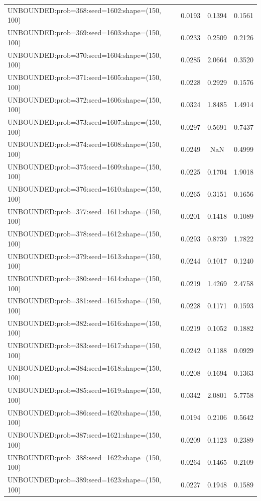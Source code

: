 \begin{longtable}{lccc}
UNBOUNDED:prob=368:seed=1602:shape=(150, 100) &   0.0193 &  0.1394 &  0.1561 \\
UNBOUNDED:prob=369:seed=1603:shape=(150, 100) &   0.0233 &  0.2509 &  0.2126 \\
UNBOUNDED:prob=370:seed=1604:shape=(150, 100) &   0.0285 &  2.0664 &  0.3520 \\
UNBOUNDED:prob=371:seed=1605:shape=(150, 100) &   0.0228 &  0.2929 &  0.1576 \\
UNBOUNDED:prob=372:seed=1606:shape=(150, 100) &   0.0324 &  1.8485 &  1.4914 \\
UNBOUNDED:prob=373:seed=1607:shape=(150, 100) &   0.0297 &  0.5691 &  0.7437 \\
UNBOUNDED:prob=374:seed=1608:shape=(150, 100) &   0.0249 &     NaN &  0.4999 \\
UNBOUNDED:prob=375:seed=1609:shape=(150, 100) &   0.0225 &  0.1704 &  1.9018 \\
UNBOUNDED:prob=376:seed=1610:shape=(150, 100) &   0.0265 &  0.3151 &  0.1656 \\
UNBOUNDED:prob=377:seed=1611:shape=(150, 100) &   0.0201 &  0.1418 &  0.1089 \\
UNBOUNDED:prob=378:seed=1612:shape=(150, 100) &   0.0293 &  0.8739 &  1.7822 \\
UNBOUNDED:prob=379:seed=1613:shape=(150, 100) &   0.0244 &  0.1017 &  0.1240 \\
UNBOUNDED:prob=380:seed=1614:shape=(150, 100) &   0.0219 &  1.4269 &  2.4758 \\
UNBOUNDED:prob=381:seed=1615:shape=(150, 100) &   0.0228 &  0.1171 &  0.1593 \\
UNBOUNDED:prob=382:seed=1616:shape=(150, 100) &   0.0219 &  0.1052 &  0.1882 \\
UNBOUNDED:prob=383:seed=1617:shape=(150, 100) &   0.0242 &  0.1188 &  0.0929 \\
UNBOUNDED:prob=384:seed=1618:shape=(150, 100) &   0.0208 &  0.1694 &  0.1363 \\
UNBOUNDED:prob=385:seed=1619:shape=(150, 100) &   0.0342 &  2.0801 &  5.7758 \\
UNBOUNDED:prob=386:seed=1620:shape=(150, 100) &   0.0194 &  0.2106 &  0.5642 \\
UNBOUNDED:prob=387:seed=1621:shape=(150, 100) &   0.0209 &  0.1123 &  0.2389 \\
UNBOUNDED:prob=388:seed=1622:shape=(150, 100) &   0.0264 &  0.1465 &  0.2109 \\
UNBOUNDED:prob=389:seed=1623:shape=(150, 100) &   0.0227 &  0.1948 &  0.1589 \\

\end{longtable}
